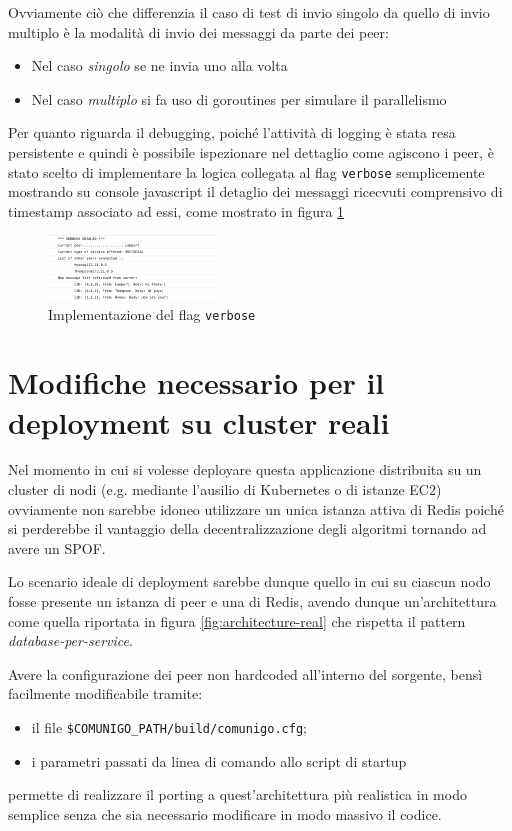 \documentclass[conference]{IEEEtran}
\begin{document}
Ovviamente ciò che differenzia il caso di test di invio singolo da quello di invio multiplo è la modalità di invio dei messaggi da parte dei peer:
\begin{itemize}
\item Nel caso \textsl{singolo} se ne invia uno alla volta
\item Nel caso \textsl{multiplo} si fa uso di goroutines per simulare il parallelismo
\end{itemize}

Per quanto riguarda il debugging, poiché l'attività di logging è stata resa persistente e quindi è possibile ispezionare nel dettaglio come agiscono i peer, è stato scelto di implementare la logica collegata al flag \texttt{verbose} semplicemente mostrando su console javascript il detaglio dei messaggi ricecvuti comprensivo di timestamp associato ad essi, come mostrato in figura \ref{fig:debug}

\begin{figure}[htbp]
\centerline{\includegraphics[width=0.4\textwidth]{figs/debug.png}}
\caption{Implementazione del flag \texttt{verbose}}
\label{fig:debug}
\end{figure}

\section{Modifiche necessario per il deployment su cluster reali}
Nel momento in cui si volesse deployare questa applicazione distribuita su un cluster di nodi (e.g. mediante l'ausilio di Kubernetes o di istanze EC2) ovviamente non sarebbe idoneo utilizzare un unica istanza attiva di Redis poiché si perderebbe il vantaggio della decentralizzazione degli algoritmi tornando ad avere un SPOF.

Lo scenario ideale di deployment sarebbe dunque quello in cui su ciascun nodo fosse presente un istanza di peer e una di Redis, avendo dunque un'architettura come quella riportata in figura \ref{fig:architecture-real} che rispetta il pattern \textit{database-per-service}.

Avere la configurazione dei peer non hardcoded all'interno del sorgente, bensì facilmente modificabile tramite:
\begin{itemize}
\item il file \texttt{\$COMUNIGO\_PATH/build/comunigo.cfg};
\item i parametri passati da linea di comando allo script di startup
\end{itemize}
permette di realizzare il porting a quest'architettura più realistica in modo semplice senza che sia necessario modificare in modo massivo il codice.
\end{document}
